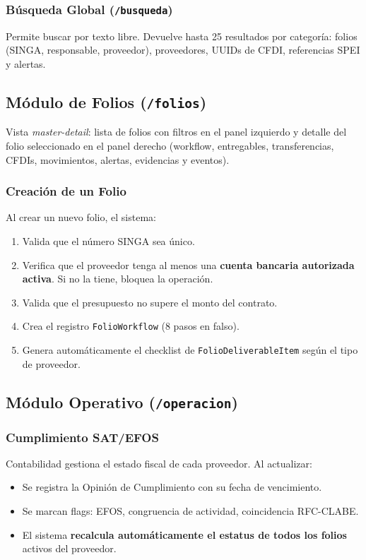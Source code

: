 \documentclass[12pt,a4paper]{article}
\begin{document}
\subsubsection{B\'usqueda Global (\texttt{/busqueda})}

Permite buscar por texto libre. Devuelve hasta 25 resultados por categor\'ia:
folios (SINGA, responsable, proveedor), proveedores, UUIDs de CFDI, referencias
SPEI y alertas.

\subsection{M\'odulo de Folios (\texttt{/folios})}

Vista \textit{master-detail}: lista de folios con filtros en el panel izquierdo
y detalle del folio seleccionado en el panel derecho (workflow, entregables,
transferencias, CFDIs, movimientos, alertas, evidencias y eventos).

\subsubsection{Creaci\'on de un Folio}

Al crear un nuevo folio, el sistema:
\begin{enumerate}
  \item Valida que el n\'umero SINGA sea \'unico.
  \item Verifica que el proveedor tenga al menos una \textbf{cuenta bancaria autorizada
    activa}. Si no la tiene, bloquea la operaci\'on.
  \item Valida que el presupuesto no supere el monto del contrato.
  \item Crea el registro \texttt{FolioWorkflow} (8 pasos en falso).
  \item Genera autom\'aticamente el checklist de \texttt{FolioDeliverableItem}
    seg\'un el tipo de proveedor.
\end{enumerate}

\subsection{M\'odulo Operativo (\texttt{/operacion})}

\subsubsection{Cumplimiento SAT/EFOS}

Contabilidad gestiona el estado fiscal de cada proveedor. Al actualizar:
\begin{itemize}
  \item Se registra la Opini\'on de Cumplimiento con su fecha de vencimiento.
  \item Se marcan flags: EFOS, congruencia de actividad, coincidencia RFC-CLABE.
  \item El sistema \textbf{recalcula autom\'aticamente el estatus de todos los folios}
    activos del proveedor.
\end{itemize}
\end{document}
